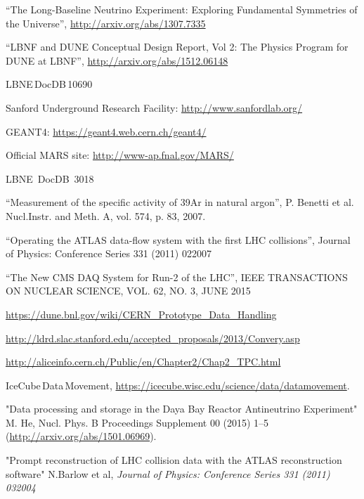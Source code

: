 \begin{thebibliography}{99}

 ``The Long-Baseline Neutrino Experiment: Exploring Fundamental Symmetries of the Universe'',  \url{http://arxiv.org/abs/1307.7335}

 ``LBNF and DUNE Conceptual Design Report, Vol 2: The Physics Program for DUNE at LBNF'', \url{http://arxiv.org/abs/1512.06148}

 LBNE\,DocDB\,10690  %

 Sanford Underground Research Facility: \url{http://www.sanfordlab.org/}

 GEANT4: \url{https://geant4.web.cern.ch/geant4/}

 Official MARS site: \url{http://www-ap.fnal.gov/MARS/}

 LBNE~DocDB~3018%

 ``Measurement of the specific activity of 39Ar in natural argon'', P. Benetti et al. Nucl.Instr. and Meth. A, vol. 574, p. 83, 2007.

 ``Operating the ATLAS data-flow system with the first LHC collisions'', Journal of Physics: Conference Series 331 (2011) 022007

 ``The New CMS DAQ System for Run-2 of the LHC'', IEEE TRANSACTIONS ON NUCLEAR SCIENCE, VOL. 62, NO. 3, JUNE 2015

 \url{https://dune.bnl.gov/wiki/CERN_Prototype_Data_Handling}

 \url{http://ldrd.slac.stanford.edu/accepted_proposals/2013/Convery.asp}

 \url{http://aliceinfo.cern.ch/Public/en/Chapter2/Chap2_TPC.html}

 IceCube\,Data\,Movement, \url{https://icecube.wisc.edu/science/data/datamovement}.

"Data processing and storage in the Daya Bay Reactor Antineutrino Experiment" M. He, Nucl. Phys. B Proceedings Supplement 00 (2015) 1–5 (\url{http://arxiv.org/abs/1501.06969}).

 "Prompt reconstruction of LHC collision data with the ATLAS reconstruction software" N.Barlow et al, \textit{Journal of Physics: Conference Series 331 (2011) 032004}


\end{thebibliography}
